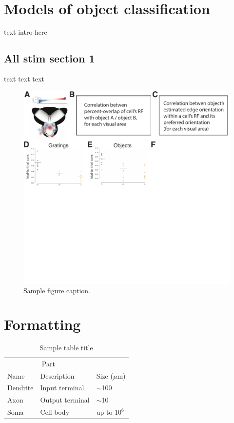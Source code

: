 \documentclass{article}
\begin{document}
\section{Models of object classification}
\label{sec:others}
text intro here

\subsection{All stim section 1}
text text text

\begin{figure}[ht]
  \centering
  \includegraphics{figures/allstim.pdf}
  \caption{Sample figure caption.}
  \label{fig:fig1}
\end{figure}



\section{Formatting}

\begin{table}
 \caption{Sample table title}
  \centering
  \begin{tabular}{lll}
    \toprule
    \multicolumn{2}{c}{Part}                   \\
    \cmidrule(r){1-2}
    Name     & Description     & Size ($\mu$m) \\
    \midrule
    Dendrite & Input terminal  & $\sim$100     \\
    Axon     & Output terminal & $\sim$10      \\
    Soma     & Cell body       & up to $10^6$  \\
    \bottomrule
  \end{tabular}
  \label{tab:table}
\end{table}
\end{document}
